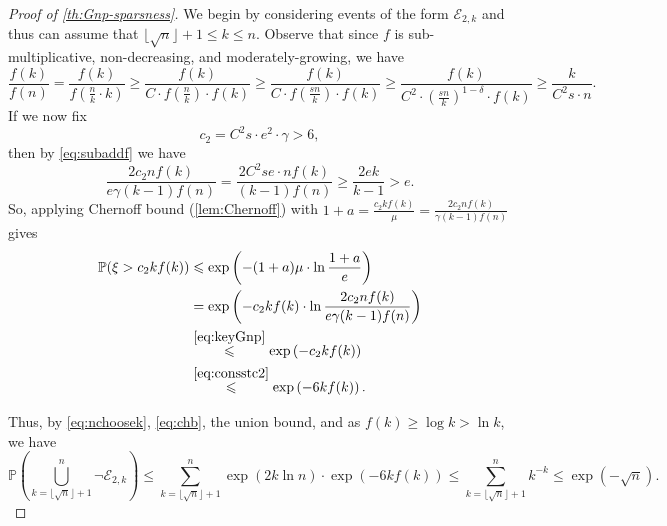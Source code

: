 \documentclass[letterpaper,11pt]{article}
\newcommand{\Slinn}{moderately-growing\xspace}
\newcommand{\Smull}{sub-multiplicative\xspace}
\theoremstyle{definition}
\theoremstyle{remark}
\renewcommand{\leq}{\leqslant}
\renewcommand{\geq}{\geqslant}
\begin{document}
\begin{proof}[Proof of \cref{th:Gnp-sparsness}]
We begin by considering events of the form $\mathcal{E}_{2,k}$ and thus can assume that $\lfloor \sqrt{n}\rfloor +1 \leq k\leq n  $. Observe that since $f$ is \Smull, non-decreasing,  and \Slinn, we have 
\begin{equation}\label{eq:subaddf}
	\frac{f(k)}{ f(n)}  =  \frac{f(k)}{ f\left(\frac{n}{k}\cdot  k\right)}  \geq   \frac{f(k)}{ C\cdot f( \frac{n}{k})\cdot f(k)}  \geq   \frac{f(k)}{ C\cdot f( \frac{sn}{k})\cdot f(k)}  \geq \frac{f(k)}{ C^2\cdot ( \frac{sn}{k})^{1-\delta} \cdot f(k)} \geq \frac{k}{C^2s\cdot n}  
	.\end{equation}If we now fix \begin{equation}\label{eq:consstc2} c_2  = C^2s\cdot  e^2 \cdot \gamma >6 ,\end{equation} then by \eqref{eq:subaddf} we have 
\begin{equation}\label{eq:keyGnp} \frac{2c_2nf(k)}{e\gamma(k-1)f(n)} =  \frac{ 2C^2 s e  \cdot nf(k)}{(k-1)f(n)} \geq  \frac{ 2e k}{k-1} > e.   \end{equation}
So, applying Chernoff bound (\cref{lem:Chernoff})  with $1+a= \frac{c_2 k f(k)}{\mu} = \frac{2c_2nf(k)}{\gamma(k-1)f(n)} $ gives
\begin{align}\label{eq:chb}
\mathbb{P}(\xi>c_2 kf(k))&\leq\exp \left(-(1+a)\mu\cdot \ln  \frac{1+a}{e}\right) \notag \\
&=  \exp\left(-c_2 k f(k)\cdot\ln \frac{2c_2nf(k)}{e\gamma(k-1)f(n)}  \right) \notag \\
&\stackrel{\eqref{eq:keyGnp}}{\leq} \exp\left(-c_2 k f(k)   \right)\notag\\
&\stackrel{\eqref{eq:consstc2}}{\leq} \exp\left(-6 k f(k)   \right). \end{align}

Thus, by \eqref{eq:nchoosek}, \eqref{eq:chb}, the union bound, and as $f(k) \geq \log k > \ln k$, we have
\begin{equation} \label{eq:union1}
	\mathbb{P}\left(\bigcup_{k = \lfloor \sqrt{n}\rfloor +1}^n\neg \mathcal{E}_{2,k}  \right)  
	\leq \sum_{k = \lfloor \sqrt{n}\rfloor + 1}^n  \exp\left(2k\ln n\right)\cdot  \exp\left(-6k f(k)   \right)\leq \sum_{k = \lfloor \sqrt{n}\rfloor + 1}^n k^{-k} \leq  \exp(- \sqrt{n}) .
\end{equation}




\end{proof}
\end{document}

